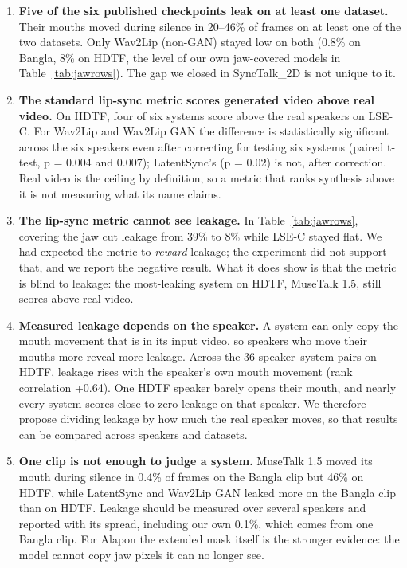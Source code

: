 \begin{enumerate}
    \item \textbf{Five of the six published checkpoints leak on at least one dataset.} Their mouths moved during silence in 20--46\% of frames on at least one of the two datasets. Only Wav2Lip (non-GAN) stayed low on both (0.8\% on Bangla, 8\% on HDTF, the level of our own jaw-covered models in Table~\ref{tab:jawrows}). The gap we closed in SyncTalk\_2D is not unique to it.
    \item \textbf{The standard lip-sync metric scores generated video above real video.} On HDTF, four of six systems score above the real speakers on LSE-C. For Wav2Lip and Wav2Lip GAN the difference is statistically significant across the six speakers even after correcting for testing six systems (paired t-test, p = 0.004 and 0.007); LatentSync's (p = 0.02) is not, after correction. Real video is the ceiling by definition, so a metric that ranks synthesis above it is not measuring what its name claims.
    \item \textbf{The lip-sync metric cannot see leakage.} In Table~\ref{tab:jawrows}, covering the jaw cut leakage from 39\% to 8\% while LSE-C stayed flat. We had expected the metric to \textit{reward} leakage; the experiment did not support that, and we report the negative result. What it does show is that the metric is blind to leakage: the most-leaking system on HDTF, MuseTalk 1.5, still scores above real video.
    \item \textbf{Measured leakage depends on the speaker.} A system can only copy the mouth movement that is in its input video, so speakers who move their mouths more reveal more leakage. Across the 36 speaker--system pairs on HDTF, leakage rises with the speaker's own mouth movement (rank correlation +0.64). One HDTF speaker barely opens their mouth, and nearly every system scores close to zero leakage on that speaker. We therefore propose dividing leakage by how much the real speaker moves, so that results can be compared across speakers and datasets.
    \item \textbf{One clip is not enough to judge a system.} MuseTalk 1.5 moved its mouth during silence in 0.4\% of frames on the Bangla clip but 46\% on HDTF, while LatentSync and Wav2Lip GAN leaked more on the Bangla clip than on HDTF. Leakage should be measured over several speakers and reported with its spread, including our own 0.1\%, which comes from one Bangla clip. For Alapon the extended mask itself is the stronger evidence: the model cannot copy jaw pixels it can no longer see.
\end{enumerate}

